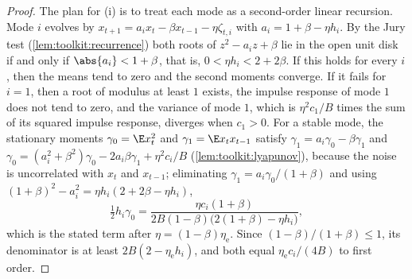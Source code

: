 \begin{refsection}

\begin{proof}
The plan for (i) is to treat each mode as a second-order linear recursion. Mode $i$ evolves by $x_{t+1}=a_ix_t-\beta x_{t-1}-\eta\zeta_{t,i}$ with $a_i=1+\beta-\eta h_i$. By the Jury test (\cref{lem:toolkit:recurrence}) both roots of $z^2-a_iz+\beta$ lie in the open unit disk if and only if $\abs{a_i}<1+\beta$, that is, $0<\eta h_i<2+2\beta$. If this holds for every $i$, then the means tend to zero and the second moments converge. If it fails for $i=1$, then a root of modulus at least $1$ exists, the impulse response of mode $1$ does not tend to zero, and the variance of mode $1$, which is $\eta^2c_1/B$ times the sum of its squared impulse response, diverges when $c_1>0$. For a stable mode, the stationary moments $\gamma_0=\E x_t^2$ and $\gamma_1=\E x_tx_{t-1}$ satisfy $\gamma_1=a_i\gamma_0-\beta\gamma_1$ and $\gamma_0=(a_i^2+\beta^2)\gamma_0-2a_i\beta\gamma_1+\eta^2c_i/B$ (\cref{lem:toolkit:lyapunov}), because the noise is uncorrelated with $x_t$ and $x_{t-1}$; eliminating $\gamma_1=a_i\gamma_0/(1+\beta)$ and using $(1+\beta)^2-a_i^2=\eta h_i(2+2\beta-\eta h_i)$,
\[
  \tfrac12h_i\gamma_0=\frac{\eta c_i(1+\beta)}{2B(1-\beta)\bigl(2(1+\beta)-\eta h_i\bigr)},
\]
which is the stated term after $\eta=(1-\beta)\eta_{\mathrm e}$. Since $(1-\beta)/(1+\beta)\le1$, its denominator is at least $2B(2-\eta_{\mathrm e}h_i)$, and both equal $\eta_{\mathrm e}c_i/(4B)$ to first order.
\end{proof}


\end{refsection}
